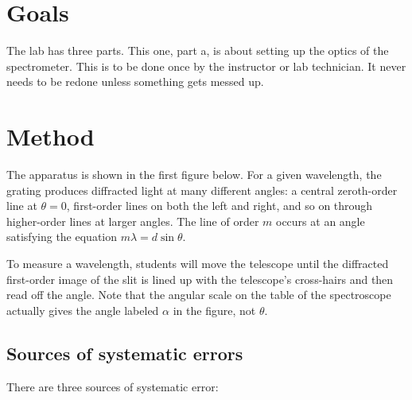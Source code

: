 \renewcommand\thechapter{\arabic{chapter}a}
\label{lab:spectrometer}
\renewcommand\thechapter{\arabic{chapter}}

\apparatus
{}

\section*{Goals}

The lab has three parts. This one, part a, is about setting
up the optics of the spectrometer. 
This is to be done once by the instructor or lab technician. 
It never needs to be redone unless something gets messed up.

\introduction


\section*{Method}

The apparatus  is shown in the first figure below. For a given wavelength, the
grating produces diffracted light at many different angles:
a central zeroth-order line at $\theta=0$, first-order lines on
both the left and right, and so on through higher-order
lines at larger angles.  The line of order $m$ occurs at an
angle satisfying the equation $m\lambda=d\sin\theta$.

To measure a wavelength, students will move the telescope until
the diffracted first-order image of the slit is lined up
with the telescope's cross-hairs and then read off the
angle. Note that the angular scale on the table of the
spectroscope actually gives the angle labeled $\alpha$ in
the figure, not $\theta$.

\subsection*{Sources of systematic errors}

There are three sources of systematic error:

